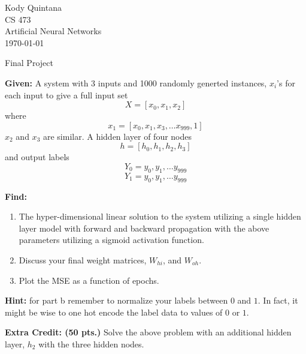 \documentclass[14pt]{article}
\begin{document}
\begin{flushleft}
 
\large
Kody Quintana\\
CS 473\\
Artificial Neural Networks\\
\today\\
\boldmath

\begin{center}
Final Project
\end{center}

\question
\textbf{Given:}
	A system with 3 inputs and 1000 randomly generted instances, $x_i$'s
	for each input to give a full input set
	\[X = [x_0, x_1, x_2] \]
	where
	\[x_1 = [x_0, x_1, x_3, \ldots x_{999}, 1]\]
	$x_2$ and $x_3$ are similar.
	A hidden layer of four nodes
	\[h = [h_0, h_1, h_2, h_3]\]
	and output labels
	\[Y_0 = y_0, y_1, \ldots y_{999}\]
	\[Y_1 = y_0, y_1, \ldots y_{999}\]
	
\textbf{Find:}
	\begin{enumerate}
	\item The hyper-dimensional linear solution to the system utilizing a single hidden layer model with forward and backward propagation with the above parameters
		utilizing a sigmoid activation function.
	\item Discuss your final weight matrices, $W_{hi}$, and $W_{oh}$.
	\item Plot the MSE as a function of epochs.
	\end{enumerate}

\textbf{Hint:}
	for part b remember to normalize your labels between $0$ and $1$.
	In fact, it might be wise to one hot encode the label data to values of $0$ or $1$.
\closequestion

\question
\textbf{Extra Credit: (50 pts.)}
	Solve the above problem with an additional hidden layer, $h_2$ with the three hidden nodes.
\closequestion
		

\end{flushleft}
\end{document}
